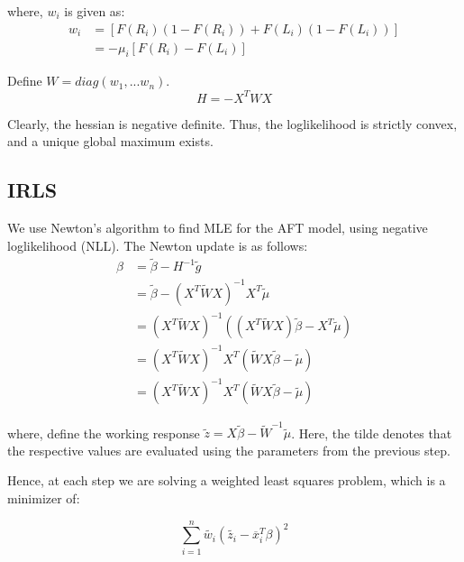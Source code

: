 \documentclass[12pt,a4paper]{report}
\begin{document}
where, $w_i$ is given as:
\begin{equation} \label{w_i}
\begin{split}
w_i & = [F(R_i) (1-F(R_i)) + F(L_i) (1-F(L_i))] \\
	& = - \mu_i [F(R_i) - F(L_i)]
\end{split}
\end{equation}

Define $W=diag(w_1, ... w_n)$.
\begin{equation}
H = - X^T W X
\end{equation}

Clearly, the hessian is negative definite. Thus, the loglikelihood is strictly convex, and a unique global
maximum exists.

\subsection*{IRLS}
We use Newton's algorithm to find MLE for the AFT model, using negative loglikelihood (NLL). The Newton update is as follows:
\begin{equation}
\begin{split}
\beta & = \widetilde{\beta} - H^{-1}\widetilde{g} \\ 
 	  & = \widetilde{\beta} - (X^T \widetilde{W} X)^{-1} X^T \widetilde{\mu} \\
 	  & = (X^T \widetilde{W} X)^{-1} ((X^T \widetilde{W} X) \widetilde{\beta} -  X^T \widetilde{\mu} ) \\
 	  & = (X^T \widetilde{W} X)^{-1} X^T (\widetilde{W} X \widetilde{\beta} -  \widetilde{\mu} ) \\
 	  & = (X^T \widetilde{W} X)^{-1} X^T (\widetilde{W} X \widetilde{\beta} -  \widetilde{\mu} )
\end{split}
\end{equation}

where, define the working response $\widetilde{z} = X \widetilde{\beta} - \widetilde{W}^{-1} \widetilde{\mu}$.
Here, the tilde denotes that the respective values are evaluated using the parameters from the previous step.

Hence, at each step we are solving a weighted least squares problem, which is a minimizer of:

\begin{equation}
\sum_{i=1}^n \widetilde{w_i} (\widetilde{z_i} - \overline x_i^T \beta)^2
\end{equation}
\end{document}
